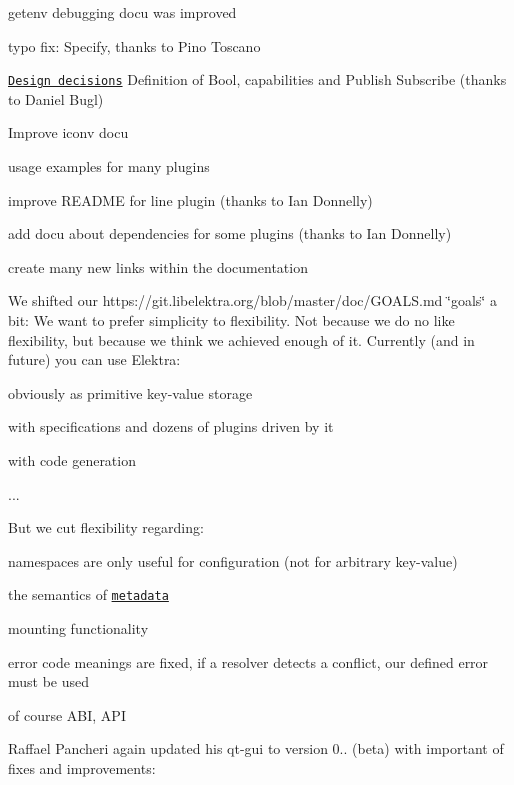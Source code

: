 \begin{DoxyItemize}
\item getenv debugging docu was improved
\item typo fix\+: Specify, thanks to Pino Toscano
\item \href{https://master.libelektra.org/doc/decisions}{\tt Design decisions} Definition of Bool, capabilities and Publish Subscribe (thanks to Daniel Bugl)
\item Improve iconv docu
\item usage examples for many plugins
\item improve R\+E\+A\+D\+ME for line plugin (thanks to Ian Donnelly)
\item add docu about dependencies for some plugins (thanks to Ian Donnelly)
\item create many new links within the documentation
\end{DoxyItemize}

We shifted our https\+://git.libelektra.\+org/blob/master/doc/\+G\+O\+A\+LS.md \char`\"{}goals\char`\"{} a bit\+: We want to prefer simplicity to flexibility. Not because we do no like flexibility, but because we think we achieved enough of it. Currently (and in future) you can use Elektra\+:


\begin{DoxyItemize}
\item obviously as primitive key-\/value storage
\item with specifications and dozens of plugins driven by it
\item with code generation
\item ...
\end{DoxyItemize}

But we cut flexibility regarding\+:


\begin{DoxyItemize}
\item namespaces are only useful for configuration (not for arbitrary key-\/value)
\item the semantics of \href{https://git.libelektra.org/blob/master/doc/METADATA.ini}{\tt metadata}
\item mounting functionality
\item error code meanings are fixed, if a resolver detects a conflict, our defined error must be used
\item of course A\+BI, A\+PI
\end{DoxyItemize}

Raffael Pancheri again updated his qt-\/gui to version 0.. (beta) with important of fixes and improvements\+:


